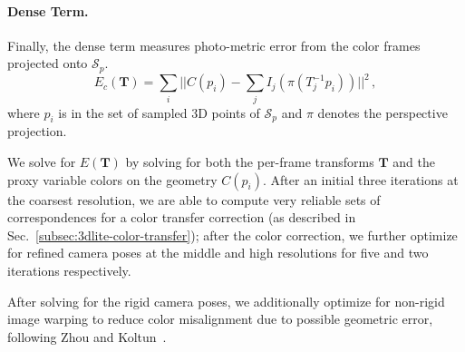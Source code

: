 \paragraph*{Dense Term.} 
Finally, the dense term measures photo-metric error from the color frames projected onto $\mathcal{S}_p$.
\begin{equation}
E_c(\mathbf{T}) = \sum_{i} ||C(p_i) - \sum_j I_j(\pi(T_j^{-1}p_i))||^2\,,
\label{eq:pose-optim-color}
\end{equation} 
where $p_i$ is in the set of sampled 3D points of $\mathcal{S}_p$ and $\pi$ denotes the perspective projection.

We solve for $E(\mathbf{T})$ by solving for both the per-frame transforms $\mathbf{T}$ and the proxy variable colors on the geometry $C(p_i)$.
After an initial three iterations at the coarsest resolution, we are able to compute very reliable sets of correspondences for a color transfer correction (as described in Sec.~\ref{subsec:3dlite-color-transfer}); after the color correction, we further optimize for refined camera poses at the middle and high resolutions for five and two iterations respectively.

After solving for the rigid camera poses, we additionally optimize for non-rigid image warping to reduce color misalignment due to possible geometric error, following Zhou and Koltun~\cite{zhou2014color}.

